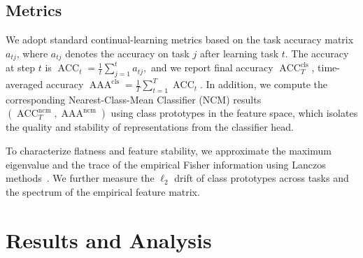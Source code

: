 \documentclass{article}
\theoremstyle{plain}
\theoremstyle{definition}
\theoremstyle{remark}
\begin{document}
\subsection{Metrics}

We adopt standard continual-learning metrics based on the task accuracy matrix $a_{tj}$, where $a_{tj}$ denotes the accuracy on task $j$ after learning task $t$. The accuracy at step $t$ is
$
\operatorname{ACC}_t = \frac{1}{t} \sum_{j=1}^{t} a_{tj},
$
and we report final accuracy $\operatorname{ACC}_T^{\mathrm{cls}}$, time-averaged accuracy $\operatorname{AAA}^{\mathrm{cls}} = \frac{1}{T}\sum_{t=1}^{T} \operatorname{ACC}_t.$
In addition, we compute the corresponding Nearest-Class-Mean Classifier (NCM) results
$(\operatorname{ACC}_T^{\mathrm{ncm}}, \operatorname{AAA}^{\mathrm{ncm}})$ using class prototypes in the feature space, which isolates the quality and stability of representations from the classifier head.

To characterize flatness and feature stability, we approximate the maximum eigenvalue and the trace of the empirical Fisher information using Lanczos methods~\cite{ghorbaniInvestigationNeuralNet2019,foretSharpnessAwareMinimizationEfficiently2021}.  
We further measure the $\ell_2$ drift of class prototypes across tasks and the spectrum of the empirical feature matrix. 


\section{Results and Analysis}
\label{sec:results}
\end{document}
